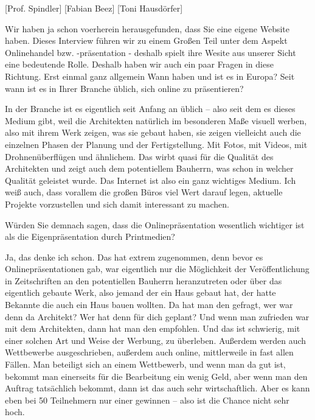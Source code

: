  
[Prof. Spindler]
[Fabian Beez]
[Toni Hausdörfer]
\addtolength{\transcriptlen}{1.5em}

\begin{description}

\Fabian Wir haben ja schon voerherein herausgefunden, dass Sie eine eigene Website haben. Dieses Interview führen wir zu einem Großen Teil unter dem Aspekt Onlinehandel bzw. -präsentation - deshalb spielt ihre Wesite aus unserer Sicht eine bedeutende Rolle. Deshalb haben wir auch ein paar Fragen in diese Richtung. Erst einmal ganz allgemein Wann haben und ist es in Europa? Seit wann ist es in Ihrer Branche üblich, sich online zu präsentieren?

\Andre In der Branche ist es eigentlich seit Anfang an üblich – also seit dem es dieses Medium gibt, weil die Architekten natürlich im besonderen Maße visuell werben, also mit ihrem Werk zeigen, was sie gebaut haben, sie zeigen vielleicht auch die einzelnen Phasen der Planung und der Fertigstellung. Mit Fotos, mit Videos, mit Drohnenüberflügen und ähnlichem. Das wirbt quasi für die Qualität des Architekten und zeigt auch dem potentiellem Bauherrn, was schon in welcher Qualität geleistet wurde. Das Internet ist also ein ganz wichtiges Medium. Ich weiß auch, dass vorallem die großen Büros viel Wert darauf legen, aktuelle Projekte vorzustellen und sich damit interessant zu machen.

\Toni Würden Sie demnach sagen, dass die Onlinepräsentation wesentlich wichtiger ist als die Eigenpräsentation durch Printmedien?

\Andre Ja, das denke ich schon. Das hat extrem zugenommen, denn bevor es Onlinepräsentationen gab, war eigentlich nur die Möglichkeit der Veröffentlichung in Zeitschriften an den potentiellen Bauherrn heranzutreten oder über das eigentlich gebaute Werk, also jemand der ein Haus gebaut hat, der hatte Bekannte die auch ein Haus bauen wollten. Da hat man den gefragt, wer war denn da Architekt? Wer hat denn für dich geplant? Und wenn man zufrieden war mit dem Architekten, dann hat man den empfohlen. Und das ist schwierig, mit einer solchen Art und Weise der Werbung, zu überleben. 
Außerdem werden auch Wettbewerbe ausgeschrieben, außerdem auch online, mittlerweile in fast allen Fällen. Man beteiligt sich an einem Wettbewerb, und wenn man da gut ist, bekommt man einerseits für die Bearbeitung ein wenig Geld, aber wenn man den Auftrag tatsächlich bekommt, dann ist das auch sehr wirtschaftlich. Aber es kann eben bei 50 Teilnehmern nur einer gewinnen – also ist die Chance nicht sehr hoch.


\end{description}
